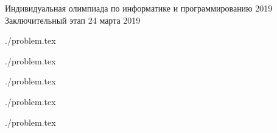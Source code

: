 \documentclass [11pt, a4paper, oneside] {article}
\begin{document}
\contest
{Индивидуальная олимпиада по информатике и программированию 2019}%
{Заключительный этап}%
{24 марта 2019}%


\renewcommand{\t}{\texttt}


\graphicspath{{../../problems/median/statements/russian/}}
{./problem.tex}
\graphicspath{{../../problems/two-texts/statements/russian/}}
{./problem.tex}
\graphicspath{{../../problems/decoding/statements/russian/}}
{./problem.tex}
\graphicspath{{../../problems/random-matrix/statements/russian/}}
{./problem.tex}
\graphicspath{{../../problems/orders/statements/russian/}}
{./problem.tex}
\end{document}
